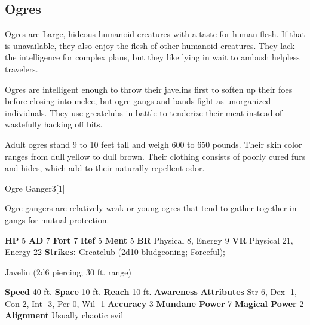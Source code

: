     \subsection{Ogres}
      
      Ogres are Large, hideous humanoid creatures with a taste for human flesh.
      If that is unavailable, they also enjoy the flesh of other humanoid creatures.
      They lack the intelligence for complex plans, but they like lying in wait to ambush helpless travelers.
    
      Ogres are intelligent enough to throw their javelins first to soften up their foes before closing into melee, but ogre gangs and bands fight as unorganized individuals.
      They use greatclubs in battle to tenderize their meat instead of wastefully hacking off bits.

      Adult ogres stand 9 to 10 feet tall and weigh 600 to 650 pounds.
      Their skin color ranges from dull yellow to dull brown.
      Their clothing consists of poorly cured furs and hides, which add to their naturally repellent odor.
    

      
  \begin{monsubsection}{Ogre Ganger}{3}[1]
    \vspace{-1em}\vspace{-1em}
    \vspace{0em}

    
          Ogre gangers are relatively weak or young ogres that tend to gather together in gangs for mutual protection.
        

    \begin{spellcontent}
      \begin{spelltargetinginfo}
        \pari \textbf{HP} 5 \monsep
          \textbf{AD} 7 \monsep
          \textbf{Fort} 7 \monsep
          \textbf{Ref} 5 \monsep
          \textbf{Ment} 5
        \pari \textbf{BR} Physical 8, Energy 9 \monsep
        \textbf{VR} Physical 21, Energy 22
        \pari \textbf{Strikes:}
            Greatclub  (2d10 bludgeoning; Forceful);
\par Javelin  (2d6 piercing; 30 ft. range)
      \end{spelltargetinginfo}
    \end{spellcontent}
    \begin{monsterfooter}
      \pari \textbf{Speed} 40 ft. \monsep
        \textbf{Space} 10 ft. \monsep
        \textbf{Reach} 10 ft.
      \pari \textbf{Awareness} 
      \pari \textbf{Attributes}
        Str 6, Dex -1,
        Con 2, Int -3,
        Per 0, Wil -1
      \pari \textbf{Accuracy} 3 \monsep
        \textbf{Mundane Power} 7 \monsep
      \textbf{Magical Power} 2
      \pari \textbf{Alignment} Usually chaotic evil
    \end{monsterfooter}
  \end{monsubsection}
  
